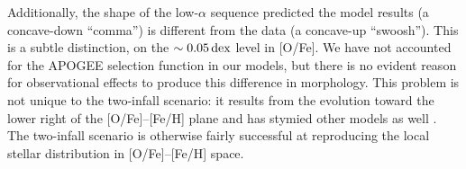 \documentclass[twocolumn,twocolappendix,linenumbers]{aastex631}
\newcommand{\yZ}[1]{$y/Z_\odot=#1$}
\newcommand{\dex}{\,{\rm dex}}
\begin{document}
Additionally, the shape of the low-$\alpha$ sequence predicted the model results (a concave-down ``comma'') is different from the data (a concave-up ``swoosh''). This is a subtle distinction, on the $\sim0.05\dex$ level in [O/Fe]. We have not accounted for the APOGEE selection function in our models, but there is no evident reason for observational effects to produce this difference in morphology. This problem is not unique to the two-infall scenario: it results from the evolution toward the lower right of the [O/Fe]--[Fe/H] plane and has stymied other models as well \citep[e.g.,][]{minchev_chemodynamical_2013,johnson_stellar_2021,prantzos_origin_2023}. The two-infall scenario is otherwise fairly successful at reproducing the local stellar distribution in [O/Fe]--[Fe/H] space.



\end{document}
